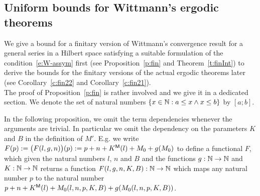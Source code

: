 \subsection{Uniform bounds for Wittmann's ergodic theorems}\label{s:Main}

We give a bound for a finitary version of Wittmann's convergence result for
a general series in a Hilbert space satisfying a suitable formulation
of the condition~\eqref{e:W-assym} first 
(see Proposition~\ref{p:fin} and Theorem~\ref{t:finInt}) to derive the bounds
for the finitary versions of the actual ergodic theorems later
(see Corollary~\ref{c:fin22} and Corollary~\ref{c:fin21}).\\
The proof of Proposition~\ref{p:fin} is rather involved and we give it in a dedicated section. We denote the set of natural numbers $\{x\in\mathbb{N} : a\leq x\wedge x\leq b\}$ by $[a;b]$.
\begin{rmk}
In the following proposition, we omit the term dependencies whenever the arguments are trivial. In particular
we omit the dependency on the parameters $K$ and $B$ in the definition of $M'$. E.g. we write $F(p):=\big(F(l,g,n)\big)(p):=p+n+K\protect{^{\textsf{\upshape M}}}(l)+M_0+g(M_0)$
to define a functional $F$, which given the natural numbers $l$, $n$ and $B$ and the
functions $g:\mathbb{N}\to\mathbb{N}$ and $K:\mathbb{N}\to\mathbb{N}$ returns a function $F(l,g,n,K,B):\mathbb{N}\to\mathbb{N}$ which maps any natural number $p$ to the natural number
 $p+n+K\protect{^{\textsf{\upshape M}}}(l)+M_0(l,n,p,K,B)+g(M_0(l,n,p,K,B))$. 
\end{rmk}
